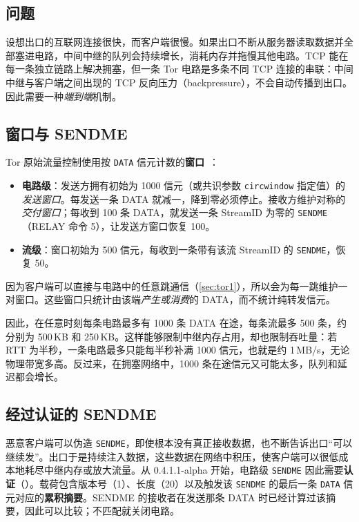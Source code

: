 \subsection{问题}

设想出口的互联网连接很快，而客户端很慢。如果出口不断从服务器读取数据并全部塞进电路，中间中继的队列会持续增长，消耗内存并拖慢其他电路。TCP 能在每一条独立链路上解决拥塞，但一条 Tor 电路是多条不同 TCP 连接的串联：中间中继与客户端之间出现的 TCP 反向压力（backpressure），不会自动传播到出口。因此需要一种\emph{端到端}机制。

\subsection{窗口与 SENDME}

Tor 原始流量控制使用按 \texttt{DATA} 信元计数的\textbf{窗口}~：
\begin{itemize}
  \item \textbf{电路级}：发送方拥有初始为 1000 信元（或共识参数 \texttt{circwindow} 指定值）的\emph{发送窗口}。每发送一条 DATA 就减一，降到零必须停止。接收方维护对称的\emph{交付窗口}；每收到 100 条 DATA，就发送一条 StreamID 为零的 \texttt{SENDME}（RELAY 命令 5），让发送方窗口恢复 100。
  \item \textbf{流级}：窗口初始为 500 信元，每收到一条带有该流 StreamID 的 \texttt{SENDME}，恢复 50。
\end{itemize}

因为客户端可以直接与电路中的任意跳通信（\cref{sec:tor1}），所以会为每一跳维护一对窗口。这些窗口只统计由该端\emph{产生或消费}的 DATA，而不统计纯转发信元。

因此，在任意时刻每条电路最多有 1000 条 DATA 在途，每条流最多 500 条，约分别为 500\,KB 和 250\,KB。这样能够限制中继内存占用，却也限制吞吐量：若 RTT 为半秒，一条电路最多只能每半秒补满 1000 信元，也就是约 1\,MB/s，无论物理带宽多高。反过来，在拥塞网络中，1000 条在途信元又可能太多，队列和延迟都会增长。

\subsection{经过认证的 SENDME}

恶意客户端可以伪造 \texttt{SENDME}，即使根本没有真正接收数据，也不断告诉出口\enquote{可以继续发}。出口于是持续注入数据，这些数据在网络中积压，使客户端可以很低成本地耗尽中继内存或放大流量。从 0.4.1.1-alpha 开始，电路级 \texttt{SENDME} 因此需要\textbf{认证}（）。载荷包含版本号（1）、长度（20）以及触发该 \texttt{SENDME} 的最后一条 \texttt{DATA} 信元对应的\textbf{累积摘要}。SENDME 的接收者在发送那条 DATA 时已经计算过该摘要，因此可以比较；不匹配就关闭电路。

